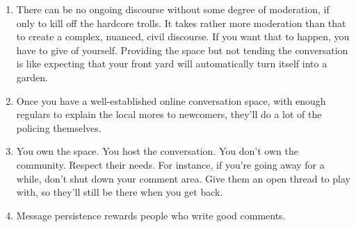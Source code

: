 \documentclass[a4paper,landscape,headrule,footrule,xetex]{foils}
\begin{document}
\begin{enumerate}
\item There can be no ongoing discourse without some degree of moderation, if only to kill off the hardcore trolls. It takes rather more moderation than that to create a complex, nuanced, civil discourse. If you want that to happen, you have to give of yourself. Providing the space but not tending the conversation is like expecting that your front yard will automatically turn itself into a garden.

\item Once you have a well-established online conversation space, with enough regulars to explain the local mores to newcomers, they'll do a lot of the policing themselves.
\item You own the space. You host the conversation. You don't own the community. Respect their needs. For instance, if you're going away for a while, don't shut down your comment area. Give them an open thread to play with, so they'll still be there when you get back.
\item Message persistence rewards people who write good comments.


\end{enumerate}
\end{document}
